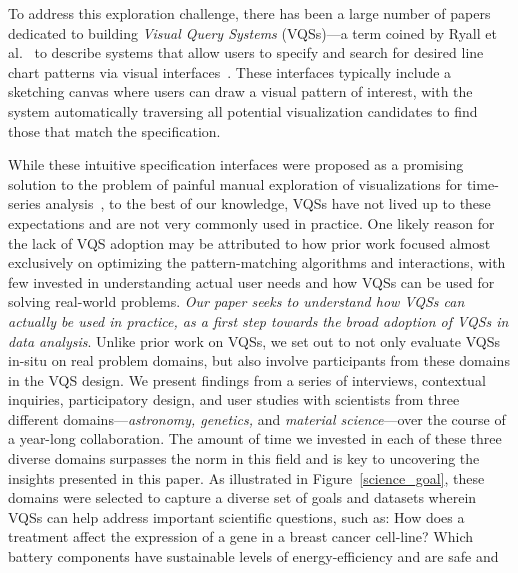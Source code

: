  To address this exploration challenge, there has been a large number of papers dedicated to building \emph{Visual Query Systems} (VQSs)---a term coined by Ryall et al.~\cite{ryall2005querylines} to describe systems that allow users to specify and search for desired line chart patterns via visual interfaces~\cite{mohebbi2011google,Hochheiser2004,wattenberg2001sketching,Siddiqui2017VLDB,ryall2005querylines,correll2016semantics,Mannino2018,Eichmann2015,Holz2009}. %
 These interfaces typically include a sketching canvas where users can draw a visual pattern of interest, with the system automatically traversing all potential visualization candidates to find those that match the specification. 
 \par While these intuitive specification interfaces were proposed as a promising solution to the problem of painful manual exploration of visualizations for time-series analysis~\cite{ryall2005querylines,wattenberg2001sketching}, to the best of our knowledge, VQSs have not lived up to these expectations and are not very commonly used in practice. One likely reason for the lack of VQS adoption may be attributed to how prior work  focused almost exclusively on optimizing the pattern-matching algorithms and interactions, with few invested in understanding actual user needs and how VQSs can be used for solving real-world problems. {\em Our paper seeks to understand how VQSs can actually be used in practice, as a first step towards the broad adoption of VQSs in data analysis}. Unlike prior work on VQSs, we set out to not only evaluate VQSs in-situ on real problem domains, but also involve participants from these domains in the VQS design. We present findings from a series of interviews, contextual inquiries, participatory design, and user studies with scientists from three different domains---{\em astronomy, genetics,} and {\em material science}---over the course of
 a year-long collaboration. The amount of time we invested in each of these three diverse domains surpasses the norm in this field and is key to uncovering the insights presented in this paper. As illustrated in Figure~\ref{science_goal}, these domains were selected to capture a diverse set of goals and datasets wherein VQSs can help address important scientific questions, such as: How does a treatment affect the expression of a gene in a breast cancer cell-line? Which battery components have sustainable levels of energy-efficiency and are safe and
